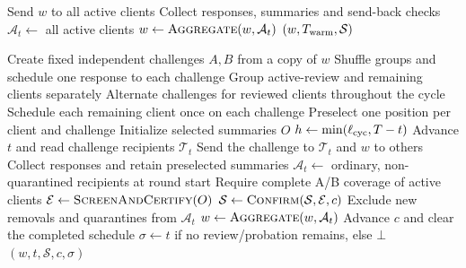 \begin{algorithm}[!htb]
\caption{Phase I: ordinary warmup}\label{alg:warmup}
\begin{algorithmic}[1]\small
{}
  \State Send $w$ to all active clients\label{ln:warm:send}
  \State Collect responses, summaries and send-back checks
  \State $\mathcal A_t\gets$ all active clients
  \State $w\gets\Call{Aggregate}{w,\mathcal A_t}$\label{ln:warm:aggregate}
 \EndFor
 \State \Return $(w,T_{\rm warm},\mathcal S)$
\EndProcedure
\end{algorithmic}
\end{algorithm}

\begin{algorithm}[!htb]
\caption{Phase II: collect and assess paired responses}\label{alg:paired}
\begin{algorithmic}[1]\small
{}
 \State Create fixed independent challenges $A,B$ from a copy of $w$
  \State Shuffle groups and schedule one response to each challenge
 \Else
  \State Group active-review and remaining clients separately
  \State Alternate challenges for reviewed clients throughout the cycle
  \State Schedule each remaining client once on each challenge
 \EndIf
 \State Preselect one position per client and challenge\label{ln:paired:select}
 \State Initialize selected summaries $O$
 \State $h\gets\min(\ell_{\rm cyc},T-t)$
  \State Advance $t$ and read challenge recipients $\mathcal T_t$
  \State Send the challenge to $\mathcal T_t$ and $w$ to others
  \State Collect responses and retain preselected summaries
  \State $\mathcal A_t\gets$ ordinary, non-quarantined recipients at round start
   \State Require complete A/B coverage of active clients
   \State $\mathcal E\gets\Call{ScreenAndCertify}{O}$\label{ln:paired:screen}
   \State $\mathcal S\gets\Call{Confirm}{\mathcal S,\mathcal E,c}$\label{ln:paired:confirm}
   \State Exclude new removals and quarantines from $\mathcal A_t$\label{ln:paired:filter}
  \EndIf
  \State $w\gets\Call{Aggregate}{w,\mathcal A_t}$
 \EndFor
  \State Advance $c$ and clear the completed schedule
  \State $\sigma\gets t$ if no review/probation remains, else $\bot$
 \EndIf
 \State \Return $(w,t,\mathcal S,c,\sigma)$
\EndProcedure
\end{algorithmic}
\end{algorithm}

